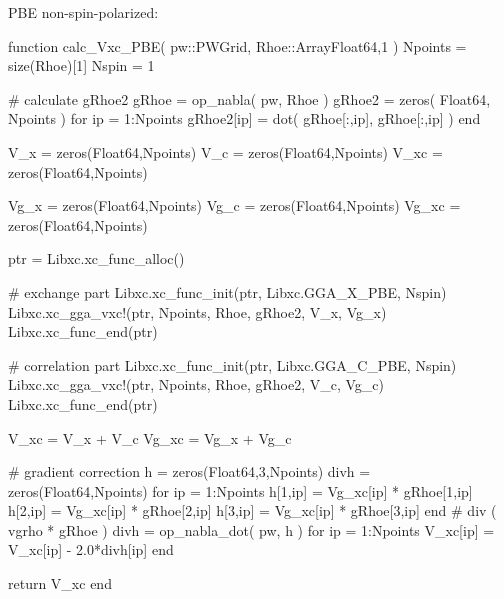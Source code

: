 PBE non-spin-polarized:
\begin{juliacode}
function calc_Vxc_PBE( pw::PWGrid, Rhoe::Array{Float64,1} )
    Npoints = size(Rhoe)[1]
    Nspin = 1

    # calculate gRhoe2
    gRhoe = op_nabla( pw, Rhoe )
    gRhoe2 = zeros( Float64, Npoints )
    for ip = 1:Npoints
        gRhoe2[ip] = dot( gRhoe[:,ip], gRhoe[:,ip] )
    end

    V_x = zeros(Float64,Npoints)
    V_c = zeros(Float64,Npoints)
    V_xc = zeros(Float64,Npoints)

    Vg_x = zeros(Float64,Npoints)
    Vg_c = zeros(Float64,Npoints)
    Vg_xc = zeros(Float64,Npoints)

    ptr = Libxc.xc_func_alloc()

    # exchange part
    Libxc.xc_func_init(ptr, Libxc.GGA_X_PBE, Nspin)
    Libxc.xc_gga_vxc!(ptr, Npoints, Rhoe, gRhoe2, V_x, Vg_x)
    Libxc.xc_func_end(ptr)

    # correlation part
    Libxc.xc_func_init(ptr, Libxc.GGA_C_PBE, Nspin)
    Libxc.xc_gga_vxc!(ptr, Npoints, Rhoe, gRhoe2, V_c, Vg_c)
    Libxc.xc_func_end(ptr)

    V_xc = V_x + V_c
    Vg_xc = Vg_x + Vg_c

    # gradient correction
    h = zeros(Float64,3,Npoints)
    divh = zeros(Float64,Npoints)
    for ip = 1:Npoints
        h[1,ip] = Vg_xc[ip] * gRhoe[1,ip]
        h[2,ip] = Vg_xc[ip] * gRhoe[2,ip]
        h[3,ip] = Vg_xc[ip] * gRhoe[3,ip]
    end
    # div ( vgrho * gRhoe )
    divh = op_nabla_dot( pw, h )
    for ip = 1:Npoints
        V_xc[ip] = V_xc[ip] - 2.0*divh[ip]
    end

    return V_xc
end
\end{juliacode}

